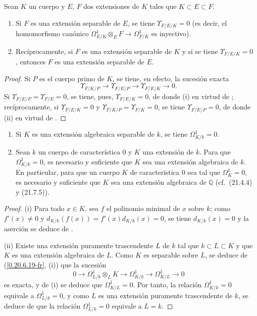 \begin{corollary}[20.6.19]
\label{0.20.6.19-fr}
Sean $K$ un cuerpo y $E$, $F$ dos extensiones de $K$ tales que
$K\subset E\subset F$.
\begin{enumerate}
  \item[\rm(i)] Si $F$ es una extensión separable de $E$, se tiene
  $\Upsilon_{F/E/K}=0$ (es decir, el homomorfismo canónico
  $\Omega^1_{E/K}\otimes_E F\to\Omega^1_{F/K}$ es inyectivo).
  \item[\rm(ii)] Recíprocamente, si $F$ es una extensión separable de $K$ y
  si se tiene $\Upsilon_{F/E/K}=0$, entonces $F$ es una extensión separable de
  $E$.
\end{enumerate}
\end{corollary}

\begin{proof}
Si $P$ es el cuerpo primo de $K$, se tiene, en efecto, la sucesión exacta
\[
  \Upsilon_{F/K/P}\to\Upsilon_{F/E/P}\to\Upsilon_{F/E/K}\to0.
\]
Si $\Upsilon_{F/E/P}=\Upsilon_{F/E}=0$, se tiene, pues,
$\Upsilon_{F/E/K}=0$, de donde (i) en virtud de ;
recíprocamente, si $\Upsilon_{F/E/K}=0$ y
$\Upsilon_{F/K/P}=\Upsilon_{F/K}=0$, se tiene
$\Upsilon_{F/E/P}=0$, de donde (ii) en virtud de .
\end{proof}

\begin{corollary}[20.6.20]
\label{0.20.6.20-fr}
\begin{enumerate}
  \item[\rm(i)] Si $K$ es una extensión algebraica separable de $k$, se tiene
  $\Omega^1_{K/k}=0$.
  \item[\rm(ii)] Sean $k$ un cuerpo de característica 0 y $K$ una extensión
  de $k$. Para que $\Omega^1_{K/k}=0$, es necesario y suficiente que $K$ sea una
  extensión algebraica de $k$. En particular, para que un cuerpo $K$ de
  característica 0 sea tal que $\Omega^1_K=0$, es necesario y suficiente que
  $K$ sea una extensión algebraica de $\mathbb{Q}$ \textup{(cf.\ (21.4.4) y
  (21.7.5))}.
\end{enumerate}
\end{corollary}

\begin{proof}
(i) Para todo $x\in K$, sea $f$ el polinomio minimal de $x$ sobre $k$; como
$f'(x)\ne0$ y $d_{K/k}(f(x))=f'(x)d_{K/k}(x)=0$, se tiene
$d_{K/k}(x)=0$ y la aserción se deduce de .

(ii) Existe una extensión puramente trascendente $L$ de $k$ tal que
$k\subset L\subset K$ y que $K$ es una extensión algebraica de $L$.
Como $K$ es separable sobre $L$, se deduce de (\ref{0.20.6.19-fr}, (i)) que
la sucesión 
\[
  0\to\Omega^1_{L/k}\otimes_L K\to\Omega^1_{K/k}
  \to\Omega^1_{K/L}\to0
\]
es exacta, y de (i) se deduce que $\Omega^1_{K/L}=0$. Por tanto, la relación
$\Omega^1_{K/k}=0$ equivale a $\Omega^1_{L/k}=0$, y como
$L$ es una extensión puramente trascendente de $k$, se deduce de  que
la relación $\Omega^1_{L/k}=0$ equivale a $L=k$.
\end{proof}

